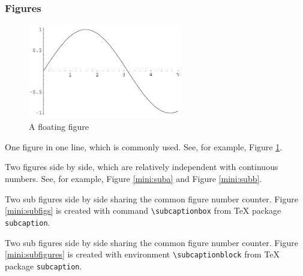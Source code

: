 \documentclass[English]{APSart}
\begin{document}
\subsubsection{Figures}
\begin{figure}[htbp]
\centering
\includegraphics[width=0.6\textwidth]{figs/sin}
\vskip -5pt
\caption{A floating figure\label{fig:fig4}}
\end{figure}


\begin{example}
	One figure in one line, which is commonly used. See, for example, Figure \ref{fig:fig4}. 		
\end{example}

\begin{example}
	Two figures side by side, which are relatively independent with continuous numbers. See, for example, Figure \ref{mini:suba} and Figure \ref{mini:subb}. 		
\end{example}

\begin{example}
	Two sub figures side by side sharing the common figure number counter. Figure \ref{mini:subfigs} is created with command \verb/\subcaptionbox/ from \TeX{} package \texttt{subcaption}.  	
\end{example}

\begin{example}
	Two sub figures side by side sharing the common figure number counter. Figure \ref{mini:subfigures} is created with environment \verb/\subcaptionblock/ from \TeX{} package \texttt{subcaption}.  	
\end{example}
\end{document}
